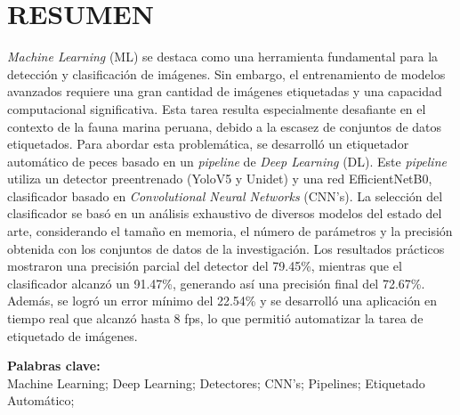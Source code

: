 \chapter*{\center \Large \vspace{-4.5cm} RESUMEN}

\textit{Machine Learning} (ML) se destaca como una herramienta 
fundamental para la detección y clasificación de imágenes. 
Sin embargo, el entrenamiento de modelos avanzados requiere 
una gran cantidad de imágenes etiquetadas y una capacidad 
computacional significativa. Esta tarea resulta especialmente 
desafiante en el contexto de la fauna marina peruana, debido 
a la escasez de conjuntos de datos etiquetados. Para abordar esta problemática, 
se desarrolló un etiquetador automático de peces basado en un 
\textit{pipeline} de \textit{Deep Learning} (DL). 
Este \textit{pipeline} utiliza un detector preentrenado (YoloV5 y Unidet) 
y una red EfficientNetB0, clasificador basado en 
\textit{Convolutional Neural Networks} (CNN's). 
La selección del clasificador se basó en un análisis exhaustivo de diversos 
modelos del estado del arte, considerando el tamaño en memoria, 
el número de parámetros y la precisión obtenida con los conjuntos 
de datos de la investigación. Los resultados prácticos mostraron 
una precisión parcial del detector del 79.45\%, mientras que el 
clasificador alcanzó un 91.47\%, generando así una precisión final 
del 72.67\%. Además, se logró un error mínimo del 22.54\% y se 
desarrolló una aplicación en tiempo real que alcanzó hasta 8 fps, 
lo que permitió automatizar la tarea de etiquetado de imágenes.


\noindent \textbf{Palabras clave:}\\
\noindent Machine Learning; Deep Learning; Detectores; CNN's; Pipelines; Etiquetado Automático;